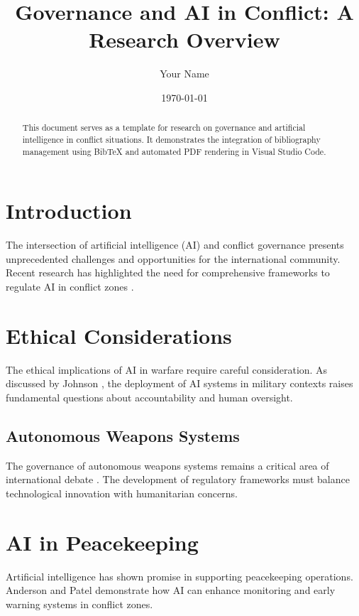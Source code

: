 \documentclass[12pt,a4paper]{article}
\title{Governance and AI in Conflict: A Research Overview}
\author{Your Name} %
\date{\today}
\begin{document}
\maketitle

\begin{abstract}
This document serves as a template for research on governance and artificial intelligence in conflict situations. It demonstrates the integration of bibliography management using BibTeX and automated PDF rendering in Visual Studio Code.
\end{abstract}

\section{Introduction}

The intersection of artificial intelligence (AI) and conflict governance presents unprecedented challenges and opportunities for the international community. Recent research has highlighted the need for comprehensive frameworks to regulate AI in conflict zones \cite{sample_ai_governance_2023, un_ai_conflict_2024}.

\section{Ethical Considerations}

The ethical implications of AI in warfare require careful consideration. As discussed by Johnson \cite{ai_ethics_warfare_2022}, the deployment of AI systems in military contexts raises fundamental questions about accountability and human oversight.

\subsection{Autonomous Weapons Systems}

The governance of autonomous weapons systems remains a critical area of international debate \cite{autonomous_weapons_governance_2023}. The development of regulatory frameworks must balance technological innovation with humanitarian concerns.

\section{AI in Peacekeeping}

Artificial intelligence has shown promise in supporting peacekeeping operations. Anderson and Patel \cite{ai_peacekeeping_2024} demonstrate how AI can enhance monitoring and early warning systems in conflict zones.
\end{document}
